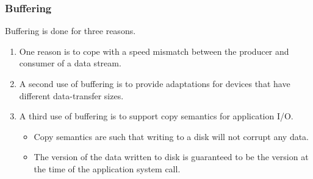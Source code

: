 \subsubsection{Buffering}\label{subsubsec:IO_Buffering}
Buffering is done for three reasons.
\begin{enumerate}[noitemsep]
\item One reason is to cope with a speed mismatch between the producer and consumer of a data stream.
\item A second use of buffering is to provide adaptations for devices that have different data-transfer sizes.
\item A third use of buffering is to support copy semantics for application I/O.
  \begin{itemize}[noitemsep]
  \item Copy semantics are such that writing to a disk will not corrupt any data.
  \item The version of the data written to disk is guaranteed to be the version at the time of the application system call.
  \end{itemize}
\end{enumerate}


